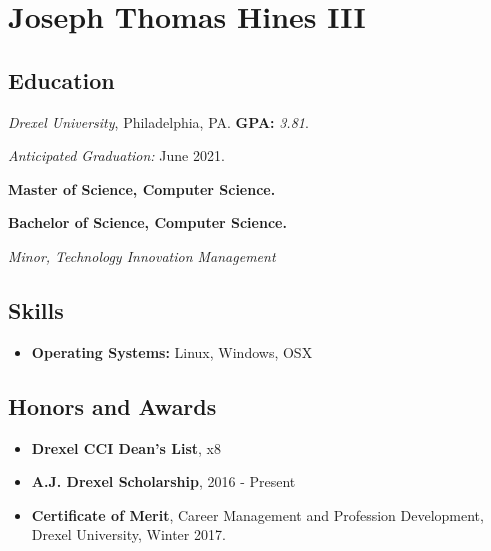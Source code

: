 \documentclass[10pt]{article}
\begin{document}
\section*{\huge Joseph Thomas Hines III}
\label{sec:title}

\begin{multicols}{2}
    \setlength\multicolsep{0pt}

    \subsection*{Education}%
    \label{sub:Education}

    \vspace{-\topsep}
    \emph{Drexel University}, Philadelphia, PA. \textbf{GPA:} \emph{3.81}.

    \emph{Anticipated Graduation:} June 2021.

    \vspace{0.2em}

    \textbf{Master of Science, Computer Science.}

    \textbf{Bachelor of Science, Computer Science.}

    \emph{Minor, Technology Innovation Management}

    \vspace{-\topsep}
    \subsection*{Skills}%
    \label{sub:Skills}

    \vspace{-\topsep}
    \begin{itemize}[leftmargin=*,noitemsep,topsep=0pt]
        \item \textbf{Operating Systems:} Linux, Windows, OSX
    \end{itemize}

    \vfill\null
    \columnbreak

    \subsection*{Honors and Awards}%
    \label{sub:Honors and Awards}

    \vspace{-\topsep}
    \begin{itemize}[leftmargin=*,noitemsep,topsep=0pt]
        \item \textbf{Drexel CCI Dean's List},
            x8
        \item \textbf{A.J. Drexel Scholarship},
            2016 - Present
        \item \textbf{Certificate of Merit}, Career Management and
            Profession Development, Drexel University, Winter 2017.
    \end{itemize}


\end{multicols}
\end{document}
